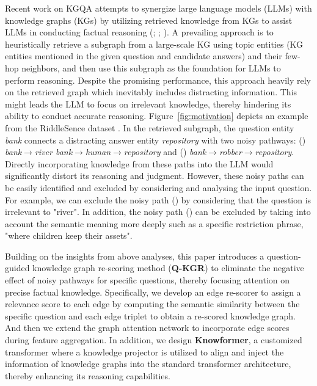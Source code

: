 \documentclass[11pt]{article}
\begin{document}
Recent work on KGQA attempts to synergize large language models (LLMs) with knowledge graphs (KGs) by utilizing retrieved knowledge from KGs to assist LLMs in conducting factual reasoning (\citealp{rog}; \citealp{knowgpt}; \citealp{tog}). 
A prevailing approach is to heuristically retrieve a subgraph from a large-scale KG using topic entities (KG entities mentioned in the given question and candidate answers) and their few-hop neighbors, and then use this subgraph as the foundation for LLMs to perform reasoning.
Despite the promising performance, this approach  heavily rely on the retrieved graph which inevitably includes distracting information.
This might leads the LLM to focus on irrelevant knowledge, thereby hindering its ability to conduct accurate reasoning.
Figure~\ref{fig:motivation} depicts an example from the RiddleSence dataset \cite{riddle}. 
In the retrieved subgraph, the question entity \textit{\textcolor[RGB]{202,12,22}{bank}} connects a distracting answer entity \textit{\textcolor[RGB]{88,141,173}{repository}} with two noisy pathways: (\uppercase\expandafter{}) \textit{bank}$\rightarrow$\textit{river bank}$\rightarrow$\textit{human}$\rightarrow$\textit{repository} and (\uppercase\expandafter{}) \textit{bank}$\rightarrow$\textit{robber}$\rightarrow$\textit{repository}. 
Directly incorporating knowledge from these paths into the LLM would significantly distort its reasoning and judgment. 
However, these noisy paths can be easily identified and excluded by considering and analysing the input question.
For example, we can exclude the noisy path (\uppercase\expandafter{}) by considering that the question is irrelevant to "river". 
In addition, the noisy path (\uppercase\expandafter{}) can be excluded by taking into account the semantic meaning more deeply such as a specific restriction phrase, "where children keep their assets".

Building on the insights from above analyses, this paper introduces a question-guided knowledge graph re-scoring method (\textbf{Q-KGR}) to eliminate the negative effect of noisy pathways for specific questions, thereby focusing attention on precise factual knowledge.
Specifically, we develop an edge re-scorer to assign a relevance score to each edge by computing the semantic similarity between the specific question and each edge triplet to obtain a re-scored knowledge graph.
And then we extend the graph attention network to incorporate edge scores during feature aggregation.
In addition, we design \textbf{Knowformer}, a customized transformer where a knowledge projector is utilized to align and inject the information of knowledge graphs into the standard transformer architecture, thereby enhancing its reasoning capabilities.
\end{document}
